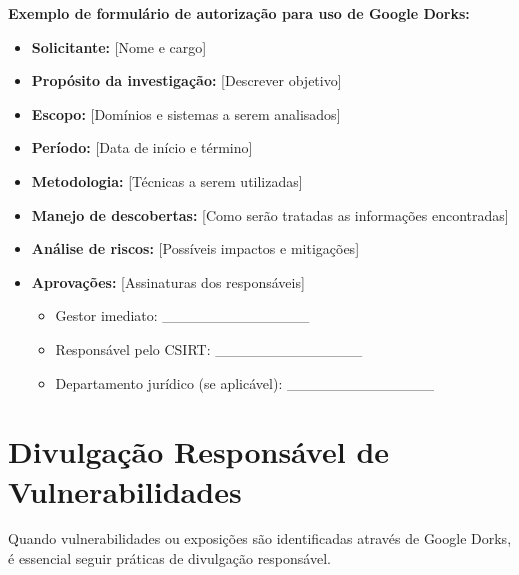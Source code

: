 \documentclass[12pt,a4paper]{book}
\begin{document}
\begin{tipbox}
\textbf{Exemplo de formulário de autorização para uso de Google Dorks:}

\begin{itemize}
    \item \textbf{Solicitante:} [Nome e cargo]
    \item \textbf{Propósito da investigação:} [Descrever objetivo]
    \item \textbf{Escopo:} [Domínios e sistemas a serem analisados]
    \item \textbf{Período:} [Data de início e término]
    \item \textbf{Metodologia:} [Técnicas a serem utilizadas]
    \item \textbf{Manejo de descobertas:} [Como serão tratadas as informações encontradas]
    \item \textbf{Análise de riscos:} [Possíveis impactos e mitigações]
    \item \textbf{Aprovações:} [Assinaturas dos responsáveis]
        \begin{itemize}
            \item Gestor imediato: \_\_\_\_\_\_\_\_\_\_\_\_\_\_
            \item Responsável pelo CSIRT: \_\_\_\_\_\_\_\_\_\_\_\_\_\_
            \item Departamento jurídico (se aplicável): \_\_\_\_\_\_\_\_\_\_\_\_\_\_
        \end{itemize}
\end{itemize}
\end{tipbox}

\section{Divulgação Responsável de Vulnerabilidades}

Quando vulnerabilidades ou exposições são identificadas através de Google Dorks, é essencial seguir práticas de divulgação responsável.
\end{document}
